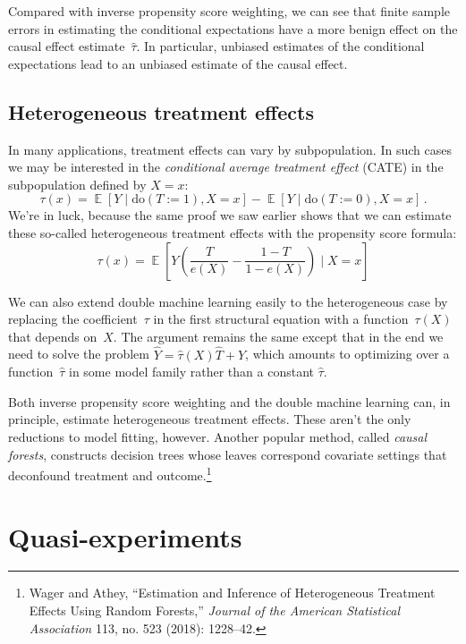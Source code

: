 \documentclass{tufte-book}
\begin{document}
Compared with inverse propensity score weighting, we can see that finite
sample errors in estimating the conditional expectations have a more
benign effect on the causal effect estimate~\(\hat\tau\). In particular,
unbiased estimates of the conditional expectations lead to an unbiased
estimate of the causal effect.

\hypertarget{heterogeneous-treatment-effects}{%
\subsection{Heterogeneous treatment
effects}\label{heterogeneous-treatment-effects}}

In many applications, treatment effects can vary by subpopulation. In
such cases we may be interested in the \emph{conditional average
treatment effect} (CATE) in the subpopulation defined by
\(X=x\):
\[
\tau(x)=\mathop\mathbb{E}[Y \mid \mathrm{do}(T:=1), X=x ] - \mathop\mathbb{E}[Y \mid \mathrm{do}(T:=0), X=x]\,.
\] We're in luck, because the same proof we saw earlier shows that we
can estimate these so-called heterogeneous treatment effects with the
propensity score formula: \[
\tau(x) = \mathop\mathbb{E}\left[Y\left(\frac{T}{e(X)}-\frac{1-T}{1-e(X)}\right)\mid X=x\right]
\]

We can also extend double machine learning easily to the heterogeneous
case by replacing the coefficient~\(\tau\) in the first structural
equation with a function~\(\tau(X)\) that depends on~\(X\). The argument
remains the same except that in the end we need to solve the problem
\(\hat Y = \hat\tau(X) \hat T + Y\), which amounts to optimizing over a
function~\(\hat\tau\) in some model family rather than a constant
\(\hat\tau\).

Both inverse propensity score weighting and the double machine learning
can, in principle, estimate heterogeneous treatment effects. These
aren't the only reductions to model fitting, however. Another popular
method, called \emph{causal forests}, constructs decision trees whose
leaves correspond covariate settings that deconfound treatment and
outcome.\footnote{Wager and Athey, {``Estimation and Inference of
  Heterogeneous Treatment Effects Using Random Forests,''} \emph{Journal
  of the American Statistical Association} 113, no. 523 (2018):
  1228--42.}

\hypertarget{quasi-experiments}{%
\section{Quasi-experiments}\label{quasi-experiments}}
\end{document}

